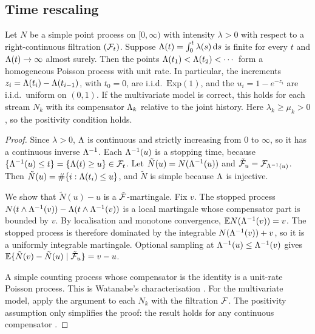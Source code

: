 \subsection{Time rescaling}\label{app:est-gof}

\begin{proposition}\label{prop:rescaling}
Let $N$ be a simple point process on $[0,\infty)$ with intensity $\lambda>0$ with respect
to a right-continuous filtration $(\mathcal{F}_t)$. Suppose $\Lambda(t)=\int_0^t\lambda(s)\,\mathrm{d} s$ is
finite for every $t$ and $\Lambda(t)\to\infty$ almost surely. Then the points
$\Lambda(t_1)<\Lambda(t_2)<\cdots$ form a homogeneous Poisson process with unit rate. In
particular, the increments $z_i=\Lambda(t_i)-\Lambda(t_{i-1})$, with $t_0=0$, are i.i.d.\
$\mathrm{Exp}(1)$, and the $u_i=1-e^{-z_i}$ are i.i.d.\ uniform on $(0,1)$. If the
multivariate model is correct, this holds for each stream $N_k$ with its compensator
$\Lambda_k$ relative to the joint history. Here $\lambda_k\ge\mu_k>0$, so the positivity
condition holds.
\end{proposition}

\begin{proof}
Since $\lambda>0$, $\Lambda$ is continuous and strictly increasing from $0$ to $\infty$, so it
has a continuous inverse $\Lambda^{-1}$. Each $\Lambda^{-1}(u)$ is a stopping time, because
$\{\Lambda^{-1}(u)\le t\}=\{\Lambda(t)\ge u\}\in\mathcal{F}_t$. Let $\tilde N(u)=N(\Lambda^{-1}(u))$ and
$\tilde{\mathcal{F}}_u=\mathcal{F}_{\Lambda^{-1}(u)}$. Then $\tilde N(u)=\#\{i:\Lambda(t_i)\le u\}$, and
$\tilde N$ is simple because $\Lambda$ is injective.

We show that $\tilde N(u)-u$ is a $\tilde{\mathcal{F}}$-martingale. Fix $v$. The stopped process
$N(t\wedge\Lambda^{-1}(v))-\Lambda(t\wedge\Lambda^{-1}(v))$ is a local martingale whose compensator
part is bounded by $v$. By localisation and monotone convergence,
$\mathbb{E} N(\Lambda^{-1}(v))=v$. The stopped process is therefore dominated by the integrable
$N(\Lambda^{-1}(v))+v$, so it is a uniformly integrable martingale. Optional sampling at
$\Lambda^{-1}(u)\le\Lambda^{-1}(v)$ gives
$\mathbb{E}\{\tilde N(v)-\tilde N(u)\mid\tilde{\mathcal{F}}_u\}=v-u$.

A simple counting process whose compensator is the identity is a unit-rate Poisson process.
This is Watanabe's characterisation \citep[Ch.~II]{bremaud1981}. For the multivariate
model, apply the argument to each $N_k$ with the filtration $\mathcal{F}$. The positivity
assumption only simplifies the proof: the result holds for any continuous compensator
\citep[Sec.~7.4]{daley2003}.
\end{proof}

